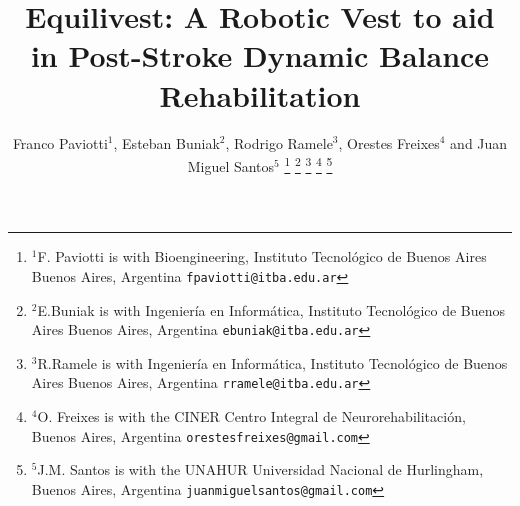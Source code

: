 \documentclass[conference]{IEEEtran}
\begin{document}
\title{Equilivest: A Robotic Vest to aid in Post-Stroke Dynamic Balance Rehabilitation
}

\author{%
Franco Paviotti$^{1}$, Esteban Buniak$^{2}$, Rodrigo Ramele$^{3}$, Orestes Freixes$^{4}$ and Juan Miguel Santos$^{5}$%
\thanks{$^{1}$F. Paviotti is with Bioengineering, Instituto Tecnológico de Buenos Aires
                    Buenos Aires, Argentina
        {\tt\small fpaviotti@itba.edu.ar}}%
\thanks{$^{2}$E.Buniak is with Ingeniería en Informática, Instituto Tecnológico de Buenos Aires
                    Buenos Aires, Argentina
        {\tt\small ebuniak@itba.edu.ar}}%
\thanks{$^{3}$R.Ramele is with Ingeniería en Informática, Instituto Tecnológico de Buenos Aires
                    Buenos Aires, Argentina
        {\tt\small rramele@itba.edu.ar}}%
\thanks{$^{4}$O. Freixes is with the CINER Centro Integral de Neurorehabilitación,
                    Buenos Aires, Argentina
        {\tt\small orestesfreixes@gmail.com}}%
\thanks{$^{5}$J.M. Santos is with the UNAHUR Universidad Nacional de Hurlingham,
                    Buenos Aires, Argentina
        {\tt\small juanmiguelsantos@gmail.com}}%
}

\end{document}

